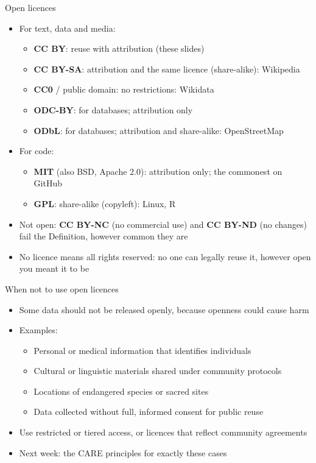 \documentclass[aspectratio=169]{beamer}
\begin{document}
\begin{frame}{Open licences}
\begin{itemize}
  \item For text, data and media:
    \begin{itemize}
      \item \textbf{CC BY}: reuse with attribution (these slides)
      \item \textbf{CC BY-SA}: attribution and the same licence (share-alike): Wikipedia
      \item \textbf{CC0} / public domain: no restrictions: Wikidata
      \item \textbf{ODC-BY}: for databases; attribution only
      \item \textbf{ODbL}: for databases; attribution and share-alike: OpenStreetMap
    \end{itemize}
  \item For code:
    \begin{itemize}
      \item \textbf{MIT} (also BSD, Apache 2.0): attribution only; the commonest on GitHub
      \item \textbf{GPL}: share-alike (copyleft): Linux, R
    \end{itemize}
  \item Not open: \textbf{CC BY-NC} (no commercial use) and \textbf{CC BY-ND}
    (no changes) fail the Definition, however common they are
  \item No licence means all rights reserved: no one can legally reuse it,
    however open you meant it to be
\end{itemize}
\end{frame}

\begin{frame}{When not to use open licences}
\begin{itemize}
  \item Some data should not be released openly, because openness could cause harm
  \item Examples:
    \begin{itemize}
      \item Personal or medical information that identifies individuals
      \item Cultural or linguistic materials shared under community protocols
      \item Locations of endangered species or sacred sites
      \item Data collected without full, informed consent for public reuse
    \end{itemize}
  \item Use restricted or tiered access, or licences that reflect community agreements
  \item Next week: the CARE principles for exactly these cases
\end{itemize}
\end{frame}
\end{document}

